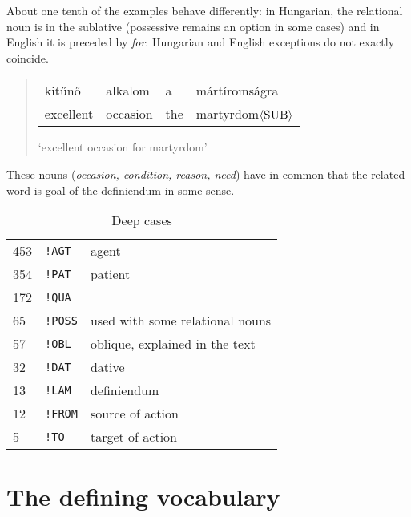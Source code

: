 \documentclass[a4paper,10pt]{article}
\begin{document}
About one tenth of the examples behave differently: in Hungarian, the relational noun is in the sublative (possessive remains an option in some cases) and in English it is preceded by \emph{for}. Hungarian and English exceptions do not exactly coincide.
\begin{quote}
 \begin{tabular}{llll}
  kitűnő		& alkalom	& a & mártíromságra
 \\ excellent	& occasion 	& the & martyrdom$\langle\textsc{SUB}\rangle$
 \end{tabular}
 
 `excellent occasion for martyrdom'
\end{quote}
These nouns (\emph{occasion, condition, reason, need}) have in common that the related word is goal of the definiendum in some sense.

\begin{table}
\begin{center}
\begin{tabular}{lll}
\\ 453	& \texttt{!AGT} & agent
\\ 354	& \texttt{!PAT} & patient
\\ 172	& \texttt{!QUA} & %
\\ 65	& \texttt{!POSS} & used with some relational nouns
\\ 57	& \texttt{!OBL} & oblique, explained in the text
\\ 32	& \texttt{!DAT} & dative\footnotemark
\\ 13	& \texttt{!LAM} & definiendum %
\\ 12	& \texttt{!FROM} & source of action
\\ 5	& \texttt{!TO}	& target of action
\end{tabular}
\end{center}
\caption{Deep cases}
\label{table_deep}
\end{table}
\section{The defining vocabulary}\label{sec_dv}%


\end{document}
